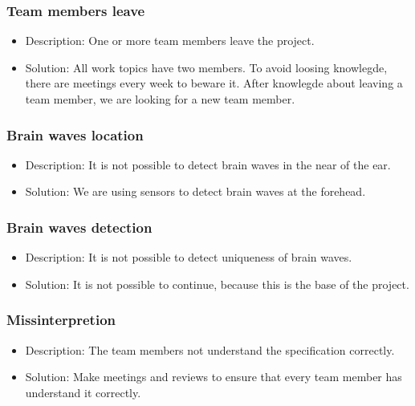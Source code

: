 \subsubsection*{Team members leave}
\begin{itemize}
 \item Description: One or more team members leave the project.
 \item Solution: All work topics have two members. To avoid loosing knowlegde, there are meetings every week to beware it. After knowlegde about leaving a team member, we are looking for a new team member.
\end{itemize}

\subsubsection*{Brain waves location}
\begin{itemize}
 \item  Description: It is not possible to detect brain waves in the near of the ear.
 \item Solution: We are using sensors to detect brain waves at the forehead.
\end{itemize}

\subsubsection*{Brain waves detection}
\begin{itemize}
 \item Description: It is not possible to detect uniqueness of brain waves.
 \item Solution: It is not possible to continue, because this is the base of the project.
\end{itemize}

\subsubsection*{Missinterpretion}
\begin{itemize}
 \item Description: The team members not understand the specification correctly.
 \item Solution: Make meetings and reviews to ensure that every team member has understand it correctly.
\end{itemize}


